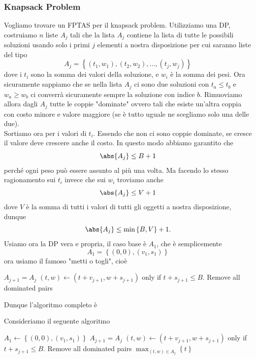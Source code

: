 \documentclass[11pt]{scrartcl}
\begin{document}
	\subsubsection{Knapsack Problem}
	
	Vogliamo trovare un FPTAS per il knapsack problem. Utilizziamo una DP, costruiamo $n$ liste $A_j$ tali che la lista $A_j$ contiene la lista di tutte le possibili soluzioni usando solo i primi $j$ elementi a nostra disposizione per cui saranno liste del tipo
	$$A_j=\left\{\left(t_1,w_1\right),\left(t_2,w_2\right),\dots,\left(t_j,w_j\right)\right\}$$ 
	dove i $t_i$ sono la somma dei valori della soluzione, e $w_i$ è la somma dei pesi. Ora sicuramente sappiamo che se nella lista $A_j$ ci sono due soluzioni con $t_a\le t_b$ e $w_a\ge w_b$ ci converrà sicuramente sempre la soluzione con indice $b$. Rimuoviamo allora dagli $A_j$ tutte le coppie "dominate" ovvero tali che esiste un'altra coppia con costo minore e valore maggiore (se è tutto uguale ne scegliamo solo una delle due). \\ Sortiamo ora per i valori di $t_i$. Essendo che non ci sono coppie dominate, se cresce il valore deve crescere anche il costo. In questo modo abbiamo garantito che 
	$$\abs{A_j}\le B+1$$
	perché ogni peso può essere assunto al più una volta. Ma facendo lo stesso ragionamento sui $t_i$ invece che sui $w_i$ troviamo anche 
	$$\abs{A_j}\le V+1$$
	dove $V$ è la somma di tutti i valori di tutti gli oggetti a nostra disposizione, dunque
	$$\abs{A_j}\le \min\left\{B,V\right\}+1.$$
	Usiamo ora la DP vera e propria, il caso base è $A_1$, che è semplicemente
	$$A_1=\left\{(0,0),(v_1,s_1)\right\}$$
	ora usiamo il famoso "metti o togli", cioè
	\begin{algorithmic}[1]
		\State $A_{j+1}=A_j$ 
			\State $(t,w)\gets (t+v_{j+1},w+s_{j+1})$ only if $t+s_{j+1}\le B$.
		\EndFor
		\State Remove all dominated pairs
	\end{algorithmic}
	Dunque l'algoritmo completo è
	\begin{algorithm}
		Consideriamo il seguente algoritmo
		\begin{algorithmic}[1]
				\State $A_1\gets\left\{(0,0),(v_1,s_1)\right\}$ 
					\State $A_{j+1}=A_j$ 
					\State $(t,w)\gets (t+v_{j+1},w+s_{j+1})$ only if $t+s_{j+1}\le B$.
					\EndFor
					\State Remove all dominated pairs
				\EndFor
				\State \Return $\max_{(t,w)\in A_j}\left\{t\right\}$
			\EndFunction
		\end{algorithmic}
	\end{algorithm}
\end{document}
